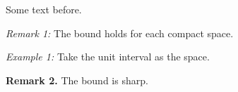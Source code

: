 \documentclass{article}
\begin{document}
Some text before.

{{\emph{Remark 1:}}} The bound holds for each compact space.

{{\emph{Example 1:}}} Take the unit interval as the space.

{ {\bf Remark 2.} } The bound is sharp.
\end{document}
